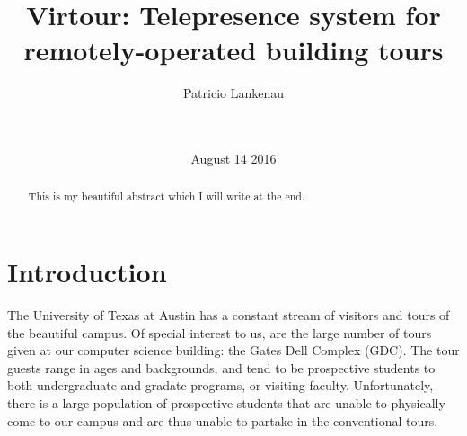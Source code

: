 \documentclass{sig-alternate-05-2015}
\begin{document}
\doi{}

\isbn{}



%

\title{Virtour: Telepresence system for remotely-operated building tours}

\author{
\alignauthor
Patricio Lankenau\\
\\
\\
}
\date{August 14 2016}

\maketitle
\begin{abstract}
  This is my beautiful abstract which I will write at the end.
\end{abstract}


\section{Introduction}

The University of Texas at Austin has a constant stream of visitors and tours
of the beautiful campus. Of special interest to us, are the large number of
tours given at our computer science building: the Gates Dell Complex (GDC). The
tour guests range in ages and backgrounds, and tend to be prospective students
to both undergraduate and gradate programs, or visiting faculty. Unfortunately,
there is a large population of prospective students that are unable to
physically come to our campus and are thus unable to partake in the
conventional tours.
\end{document}
